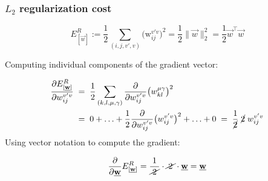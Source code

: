 \begin{frame}\frametitle{$L_2$ regularization cost}


\svspace{-5mm}

\begin{equation}
E^R_{[\vec w]} := \frac{1}{2} \sum_{(i, j, v', v)} 
			\big( \mathrm{w}_{ij}^{v'v} \big)^2 = \frac{1}{2} \lVert \vec w \rVert_2^2 = \frac{1}{2} \vec w^\top \vec w 
\end{equation}
\renewcommand{\CancelColor}{\color{gray}}

Computing individual components of the gradient vector:

	\begin{align}
		\frac{\partial{E_{[\vec{w}]}^R}}{\partial {w}_{ij}^{v'v}}
		\;&=\; \frac{1}{2} \sum_{(k, l, \mu, \gamma)} \frac{\partial}{\partial {w}_{ij}^{v'v}} \big( {w}_{kl}^{\mu\gamma} \big)^2\\
		\;&=\; 0 + \ldots + \frac{1}{2} \frac{\partial}{\partial {w}_{ij}^{v'v}} \big( {w}_{ij}^{v'v} \big)^2 + \ldots + 0
		\;=\; \frac{1}{\cancel{2}} \; \cancel{2} \; {w}_{ij}^{v'v}
	\end{align}
Using vector notation to compute the gradient:

\begin{equation}
\frac{\partial}{\partial \vec w} E^R_{[\vec w]} = \frac{1}{\wcancel{2}} \cdot \wcancel{2} \cdot \vec w = \vec w
\end{equation}




\end{frame}

